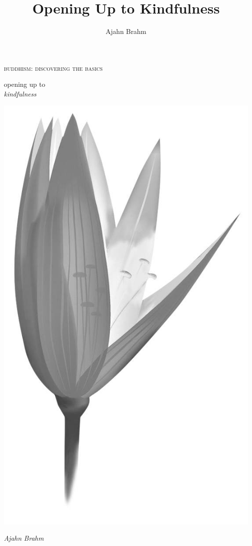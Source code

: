 \documentclass[12pt, openany]{book}
\title{Opening Up to Kindfulness}
\author{Ajahn Brahm}
\date{}
\begin{document}
 

\frontmatter

\pagestyle{empty}




\begin{center}
\lowercase{\textsc{Buddhism: Discovering the Basics}}

\vspace{2em}


\LARGE{opening up to}\\
\Huge{\textit{kindfulness}}





\vspace{3em}


\includegraphics[scale=0.1]{lotus.jpg}

\vspace{6em}


\Large\itshape{Ajahn Brahm}

\end{center}
\end{document}
